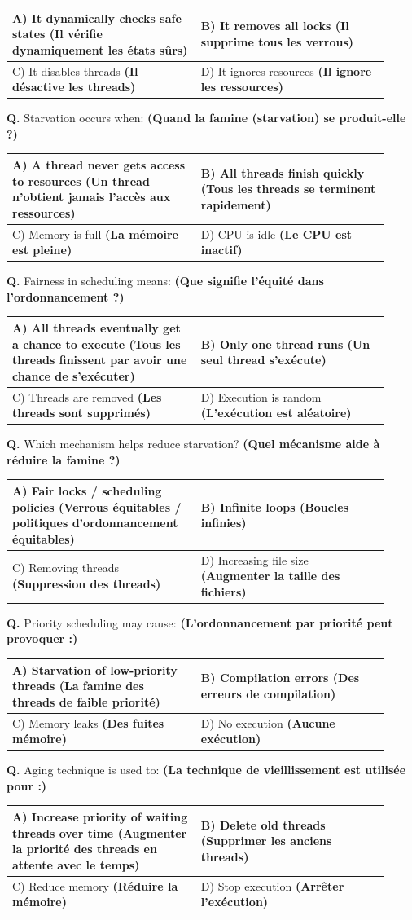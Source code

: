 \documentclass[11pt,a4paper]{article}
\newcounter{qnum}
\newcommand{\Q}{%
	\stepcounter{qnum}%
	\noindent\textbf{Q\theqnum. }%
}
\newcommand{\choices}[4]{%
	\setlength{\tabcolsep}{4pt}%
	\renewcommand{\arraystretch}{1.15}%
	\begin{tabular}{|p{0.46\linewidth}|p{0.46\linewidth}|}
		\hline
		A) #1 & B) #2 \\ \hline
		C) #3 & D) #4 \\ \hline
	\end{tabular}%
}
\begin{document}
\choices
{It dynamically checks safe states \textbf{(Il vérifie dynamiquement les états sûrs)}}
{It removes all locks \textbf{(Il supprime tous les verrous)}}
{It disables threads \textbf{(Il désactive les threads)}}
{It ignores resources \textbf{(Il ignore les ressources)}}

\Q Starvation occurs when: \textbf{(Quand la famine (starvation) se produit-elle ?) }

\choices
{A thread never gets access to resources \textbf{(Un thread n’obtient jamais l’accès aux ressources)}}
{All threads finish quickly \textbf{(Tous les threads se terminent rapidement)}}
{Memory is full \textbf{(La mémoire est pleine)}}
{CPU is idle \textbf{(Le CPU est inactif)}}

\Q Fairness in scheduling means: \textbf{(Que signifie l’équité dans l’ordonnancement ?) }

\choices
{All threads eventually get a chance to execute \textbf{(Tous les threads finissent par avoir une chance de s’exécuter)}}
{Only one thread runs \textbf{(Un seul thread s’exécute)}}
{Threads are removed \textbf{(Les threads sont supprimés)}}
{Execution is random \textbf{(L’exécution est aléatoire)}}

\Q Which mechanism helps reduce starvation? \textbf{(Quel mécanisme aide à réduire la famine ?) }

\choices
{Fair locks / scheduling policies \textbf{(Verrous équitables / politiques d’ordonnancement équitables)}}
{Infinite loops \textbf{(Boucles infinies)}}
{Removing threads \textbf{(Suppression des threads)}}
{Increasing file size \textbf{(Augmenter la taille des fichiers)}}

\Q Priority scheduling may cause: \textbf{(L’ordonnancement par priorité peut provoquer :) }

\choices
{Starvation of low-priority threads \textbf{(La famine des threads de faible priorité)}}
{Compilation errors \textbf{(Des erreurs de compilation)}}
{Memory leaks \textbf{(Des fuites mémoire)}}
{No execution \textbf{(Aucune exécution)}}

\Q Aging technique is used to: \textbf{(La technique de vieillissement est utilisée pour :) }

\choices
{Increase priority of waiting threads over time \textbf{(Augmenter la priorité des threads en attente avec le temps)}}
{Delete old threads \textbf{(Supprimer les anciens threads)}}
{Reduce memory \textbf{(Réduire la mémoire)}}
{Stop execution \textbf{(Arrêter l’exécution)}}
	
\end{document}

